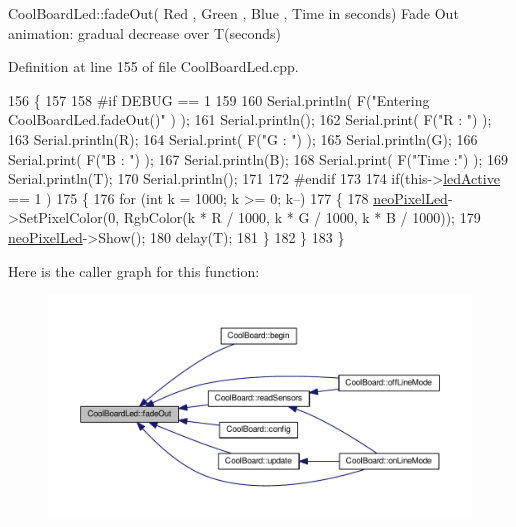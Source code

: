 Cool\+Board\+Led\+::fade\+Out( Red , Green , Blue , Time in seconds) Fade Out animation\+: gradual decrease over T(seconds) 

Definition at line 155 of file Cool\+Board\+Led.\+cpp.


\begin{DoxyCode}
156 \{
157 
158 \textcolor{preprocessor}{#if DEBUG == 1 }
159 
160     Serial.println( F(\textcolor{stringliteral}{"Entering CoolBoardLed.fadeOut()"} ) );
161     Serial.println();
162     Serial.print( F(\textcolor{stringliteral}{"R : "}) );
163     Serial.println(R);
164     Serial.print( F(\textcolor{stringliteral}{"G : "}) );
165     Serial.println(G);
166     Serial.print( F(\textcolor{stringliteral}{"B : "}) );
167     Serial.println(B);
168     Serial.print( F(\textcolor{stringliteral}{"Time :"}) );
169     Serial.println(T);
170     Serial.println();
171 
172 \textcolor{preprocessor}{#endif  }
173 
174     \textcolor{keywordflow}{if}(this->\hyperlink{class_cool_board_led_aadd04d2ecf123247718d77f42fba7f08}{ledActive} == 1 )
175     \{
176         \textcolor{keywordflow}{for} (\textcolor{keywordtype}{int} k = 1000; k >= 0; k--) 
177         \{
178             \hyperlink{class_cool_board_led_ac2c13fa462a010cd9242bf297c013923}{neoPixelLed}->SetPixelColor(0, RgbColor(k * R / 1000, k * G / 1000, k * B / 1000));
179             \hyperlink{class_cool_board_led_ac2c13fa462a010cd9242bf297c013923}{neoPixelLed}->Show();
180             delay(T);
181         \}
182     \}
183 \}
\end{DoxyCode}
Here is the caller graph for this function\+:\nopagebreak
\begin{figure}[H]
\begin{center}
\leavevmode
\includegraphics[width=350pt]{de/dc0/class_cool_board_led_a93d545679237e8cc858324367149775c_icgraph}
\end{center}
\end{figure}
\mbox{\label{class_cool_board_led_a8ed3053a36f0ed4a131f43b5b17efb61}} 
